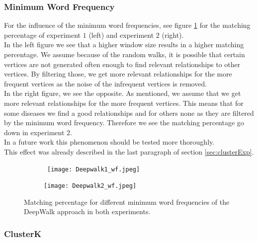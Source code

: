 \subsubsection{Minimum Word Frequency}

For the influence of the minimum word frequencies, see figure \ref{fig:dw_wf} for the matching percentage of experiment $1$ (left) and experiment $2$ (right). \\

In the left figure we see that a higher window size results in a higher matching percentage. We assume because of the random walks, it is possible that certain vertices are not generated often enough to find relevant relationships to other vertices. By filtering those, we get more relevant relationships for the more frequent vertices as the noise of the infrequent vertices is removed. \\

In the right figure, we see the opposite. As mentioned, we assume that we get more relevant relationships for the more frequent vertices. This means that for some diseases we find a good relationships and for others none as they are filtered by the minimum word frequency. Therefore we see the matching percentage go down in experiment $2$. \\
In a future work this phenomenon should be tested more thoroughly. \\

This effect was already described in the last paragraph of section \ref{sec:clusterExp}.

\begin{figure}[!htb]
	\centering
	\begin{subfigure}[b]{.49\textwidth}\
		\texttt{[image: Deepwalk1\_wf.jpeg]}
	\end{subfigure}
	\begin{subfigure}[b]{.49\textwidth}
		\texttt{[image: Deepwalk2\_wf.jpeg]}
	\end{subfigure}
	\caption{Matching percentage for different minimum word frequencies of the DeepWalk approach in both experiments.}
	\label{fig:dw_wf}
\end{figure}



\subsubsection{ClusterK}

